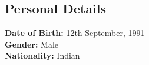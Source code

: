 \documentclass[margin, centered,lmodern]{res}
\begin{document}
\begin{resume}

\section{Personal Details}
\textbf{Date of Birth:} 12th September, 1991 \\
\textbf{Gender:} Male \\ 
\textbf{Nationality:} Indian




\end{resume}
\end{document}
